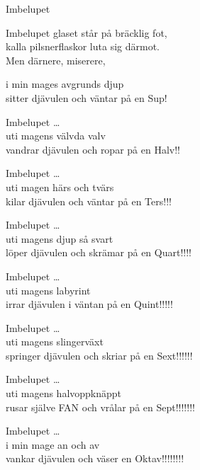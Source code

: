 \begin{song}{Imbelupet}
	
	
	
	\showversenumber
	Imbelupet glaset står på bräcklig fot,\\
	kalla pilsnerflaskor luta sig därmot.\\
	Men därnere, miserere,
	
	i min mages avgrunds djup\\
	sitter djävulen och väntar på en Sup!
    
    \showversenumber
    Imbelupet \ldots{}\\
	uti magens välvda valv\\
	vandrar djävulen och ropar på en Halv!!
	
    \showversenumber
    Imbelupet \ldots{}\\
	uti magen härs och tvärs\\
	kilar djävulen och väntar på en Ters!!!
	
    \showversenumber
    Imbelupet \ldots{}\\
	uti magens djup så svart\\
	löper djävulen och skrämar på en Quart!!!!
	
    \showversenumber
    Imbelupet \ldots{}\\
	uti magens labyrint\\
	irrar djävulen i väntan på en Quint!!!!!
	
    \showversenumber
    Imbelupet \ldots{}\\
	uti magens slingerväxt\\
	springer djävulen och skriar på en Sext!!!!!!
	
    \showversenumber
    Imbelupet \ldots{}\\
	uti magens halvoppknäppt\\
	rusar själve FAN och vrålar på en Sept!!!!!!!
	
    \showversenumber
    Imbelupet \ldots{}\\
	i min mage an och av\\
	vankar djävulen och väser en Oktav!!!!!!!!
	
\end{song}
